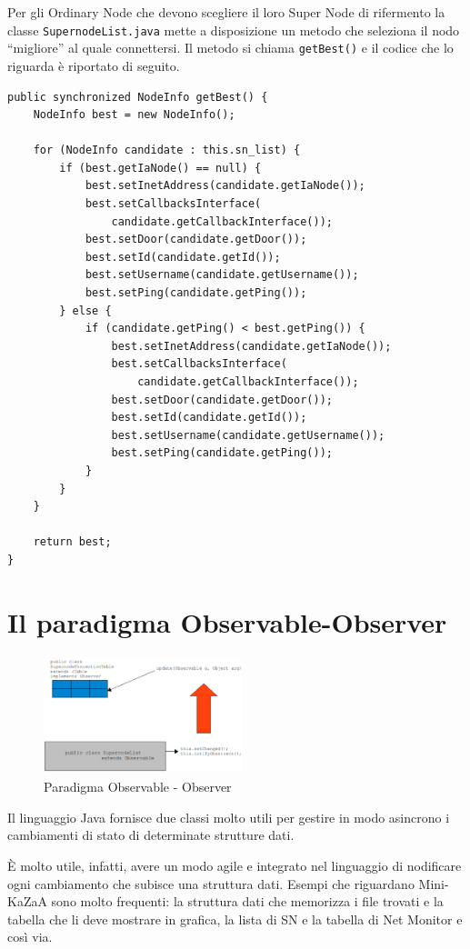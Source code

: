 Per gli Ordinary Node che devono scegliere il loro Super Node di rifermento la classe \verb|SupernodeList.java| mette a disposizione un metodo che seleziona il nodo ``migliore'' al quale connettersi. Il metodo si chiama \verb|getBest()| e il codice che lo riguarda è riportato di seguito.
\begin{lstlisting}
public synchronized NodeInfo getBest() {
	NodeInfo best = new NodeInfo();

	for (NodeInfo candidate : this.sn_list) {
		if (best.getIaNode() == null) {
			best.setInetAddress(candidate.getIaNode());
			best.setCallbacksInterface(
				candidate.getCallbackInterface());
			best.setDoor(candidate.getDoor());
			best.setId(candidate.getId());
			best.setUsername(candidate.getUsername());
			best.setPing(candidate.getPing());
		} else {
			if (candidate.getPing() < best.getPing()) {
				best.setInetAddress(candidate.getIaNode());
				best.setCallbacksInterface(
					candidate.getCallbackInterface());
				best.setDoor(candidate.getDoor());
				best.setId(candidate.getId());
				best.setUsername(candidate.getUsername());
				best.setPing(candidate.getPing());
			}
		}
	}
	
	return best;
}
\end{lstlisting}


\section{Il paradigma Observable-Observer}
\begin{figure}[t]
 \centering
 \includegraphics[width=218.72px,height=129.12px,bb=14 14 635 381]{images/observable.eps}
 \caption{Paradigma Observable - Observer}
 \label{fig:observable}
\end{figure}
Il linguaggio Java fornisce due classi molto utili per gestire in modo asincrono i cambiamenti di stato di determinate strutture dati.

\`{E} molto utile, infatti, avere un modo agile e integrato nel linguaggio di nodificare ogni cambiamento che subisce una struttura dati. Esempi che riguardano Mini-KaZaA sono molto frequenti: la struttura dati che memorizza i file trovati e la tabella che li deve mostrare in grafica, la lista di SN e la tabella di Net Monitor e così via.

